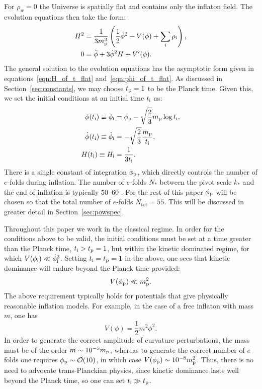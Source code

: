 For $\rho_w=0$ the Universe is spatially flat and contains only the inflaton field. The evolution equations then take the form:
%
\begin{align}
  H^2 
  &= 
  \frac{1}{3m_{\mathrm{p}}^2}
  \left(\frac{1}{2}\dot{\phi}^2 + V(\phi) + \sum_i\rho_i\right),
  \label{eqn:Friedmann_eq} 
  \\
  0
  &= 
  \ddot{\phi} +3\dot{\phi}^2H + V^\prime(\phi).
  \label{eqn:Motion_eq_Scalar}
\end{align}
%
The general solution to the evolution equations has the asymptotic form given in equations~\eqref{eqn:H_of_t_flat} and~\eqref{eqn:phi_of_t_flat}. As discussed in Section~\ref{sec:constants}, we may choose $t_{\mathrm{p}}=1$ to be the Planck time. Given this, we set the initial conditions at an initial time $t_{\mathrm{i}}$ as:
%
\begin{align}
  \phi(t_{\mathrm{i}}) \equiv \phi_{\mathrm{i}}
  &= 
  \phi_{\mathrm{p}} - \sqrt{\frac{2}{3}}m_{\mathrm{p}}\log t_{\mathrm{i}}, 
  \label{eqn:phi_ic}
  \\
  \dot\phi(t_{\mathrm{i}}) 
  \equiv 
  \dot\phi_{\mathrm{i}}
  &= 
  -\sqrt{\frac{2}{3}}\frac{m_{\mathrm{p}}}{t_{\mathrm{i}}}, 
  \label{eqn:phid_ic}
  \\
  H(t_{\mathrm{i}}) 
  \equiv 
  H_{\mathrm{i}}
  &= 
  \frac{1}{3t_{\mathrm{i}}}. 
  \label{eqn:H_ic}
\end{align}
There is a single constant of integration $\phi_{\mathrm{p}}$, which directly controls the number of $e$-folds during inflation. The number of $e$-folds $N_*$ between the pivot scale $k_*$ and the end of inflation is typically $50$--$60$ \citep{planck_collaboration_planck_2013-1}. For the rest of this paper $\phi_{\mathrm{p}}$ will be chosen so that the total number of $e$-folds $N_\mathrm{tot}=55$. This will be discussed in greater detail in Section~\ref{sec:powspec}.

Throughout this paper we work in the classical regime. In order for the conditions above to be valid, the initial conditions must be set at a time greater than the Planck time, $t_{\mathrm{i}} >t_{\mathrm{p}}=1$, but within the kinetic dominated regime, for which $V(\phi_{\mathrm{i}}) \ll \dot\phi_{\mathrm{i}}^2$. Setting $t_{\mathrm{i}}=t_{\mathrm{p}}=1$ in the above, one sees that kinetic dominance will endure beyond the Planck time provided:
%
\begin{equation}
  V(\phi_{\mathrm{p}}) \ll m_{\mathrm{p}}^2.
\end{equation}
%
The above requirement typically holds for potentials that give physically reasonable inflation models. For example, in the case of a free inflaton with mass $m$, one has \[ V(\phi) = \frac{1}{2}m^2 \phi^2.\] In order to generate the correct amplitude of curvature perturbations, the mass must be of the order $m\sim10^{-5}m_{\mathrm{p}}$, whereas to generate the correct number of $e$-folds one requires $\phi_{\mathrm{p}}\sim\mathcal{O}(10)$, in which case $V(\phi_{\mathrm{p}}) \sim 10^{-8} m_{\mathrm{p}}^2$.  Thus, there is no need to advocate trans-Planckian physics, since kinetic dominance lasts well beyond the Planck time, so one can set $t_{\mathrm{i}} \gg t_{\mathrm{p}}$.


